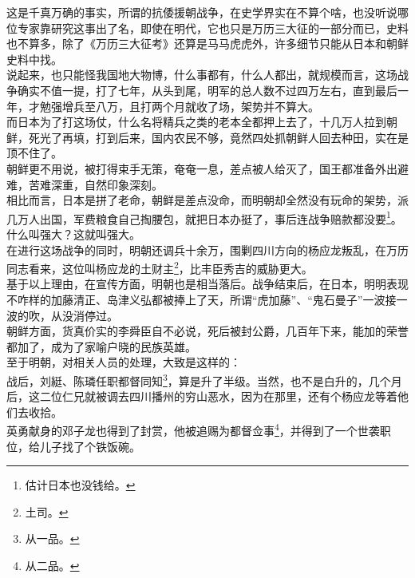\begin{multicols}{\theparacolNo}
这是千真万确的事实，所谓的抗倭援朝战争，在史学界实在不算个啥，也没听说哪位专家靠研究这事出了名，即使在明代，它也只是万历三大征的一部分而已，史料也不算多，除了《万历三大征考》还算是马马虎虎外，许多细节只能从日本和朝鲜史料中找。\\

说起来，也只能怪我国地大物博，什么事都有，什么人都出，就规模而言，这场战争确实不值一提，打了七年，从头到尾，明军的总人数不过四万左右，直到最后一年，才勉强增兵至八万，且打两个月就收了场，架势并不算大。\\

而日本为了打这场仗，什么名将精兵之类的老本全都押上去了，十几万人拉到朝鲜，死光了再填，打到后来，国内农民不够，竟然四处抓朝鲜人回去种田，实在是顶不住了。\\

朝鲜更不用说，被打得束手无策，奄奄一息，差点被人给灭了，国王都准备外出避难，苦难深重，自然印象深刻。\\

相比而言，日本是拼了老命，朝鲜是差点没命，而明朝却全然没有玩命的架势，派几万人出国，军费粮食自己掏腰包，就把日本办挺了，事后连战争赔款都没要\footnote{估计日本也没钱给。}。\\

什么叫强大？这就叫强大。\\

在进行这场战争的同时，明朝还调兵十余万，围剿四川方向的杨应龙叛乱，在万历同志看来，这位叫杨应龙的土财主\footnote{土司。}，比丰臣秀吉的威胁更大。\\

基于以上理由，在宣传方面，明朝也是相当落后。战争结束后，在日本，明明表现不咋样的加藤清正、岛津义弘都被捧上了天，所谓“虎加藤”、“鬼石曼子”一波接一波的吹，从没消停过。\\

朝鲜方面，货真价实的李舜臣自不必说，死后被封公爵，几百年下来，能加的荣誉都加了，成为了家喻户晓的民族英雄。\\

至于明朝，对相关人员的处理，大致是这样的：\\

战后，刘綎、陈璘任职都督同知\footnote{从一品。}，算是升了半级。当然，也不是白升的，几个月后，这二位仁兄就被调去四川播州的穷山恶水，因为在那里，还有个杨应龙等着他们去收拾。\\

英勇献身的邓子龙也得到了封赏，他被追赐为都督佥事\footnote{从二品。}，并得到了一个世袭职位，给儿子找了个铁饭碗。\\


\end{multicols}
